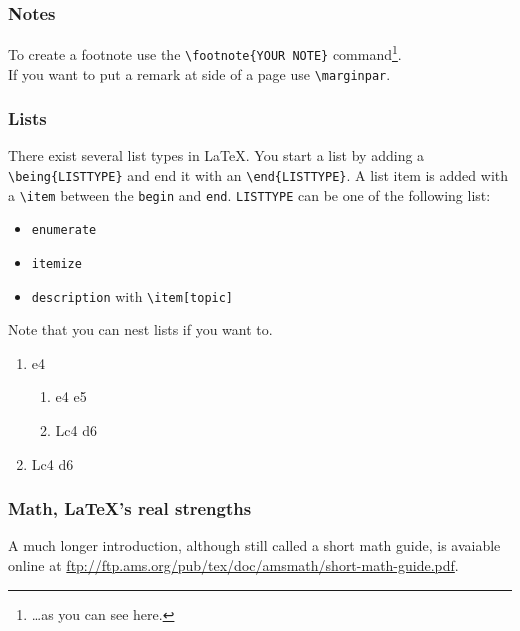 \documentclass[10pt,a4paper]{scrartcl}
\begin{document}
\subsubsection{Notes}
To create a footnote use the \verb$\footnote{YOUR NOTE}$
command\footnote{\dots as you can see here.}. \\ If you want to put a remark
at side of a page use \verb$\marginpar$.  

\subsubsection{Lists}
There exist several list types in \LaTeX. You start a list by adding a
\verb$\being{LISTTYPE}$ and end it with an \verb$\end{LISTTYPE}$. A list item
is added with a \verb$\item$ between the \texttt{begin} and \texttt{end}.
\texttt{LISTTYPE} can be one of the following list:

\begin{itemize}
\item \texttt{enumerate}
\item \texttt{itemize}
\item \texttt{description} with \verb$\item[topic]$
\end{itemize}
\noindent Note that you can nest lists if you want to.

\begin{enumerate}
\item{e4} 	
	\begin{enumerate}
	\item{e4}   e5
	\item Lc4 d6
	\end{enumerate}
\item Lc4 d6
\end{enumerate}


\subsubsection{Math, \LaTeX 's real strengths}
A much longer introduction, although still called a short math guide, is 
avaiable online at \url{ftp://ftp.ams.org/pub/tex/doc/amsmath/short-math-guide.pdf}.
\end{document}
